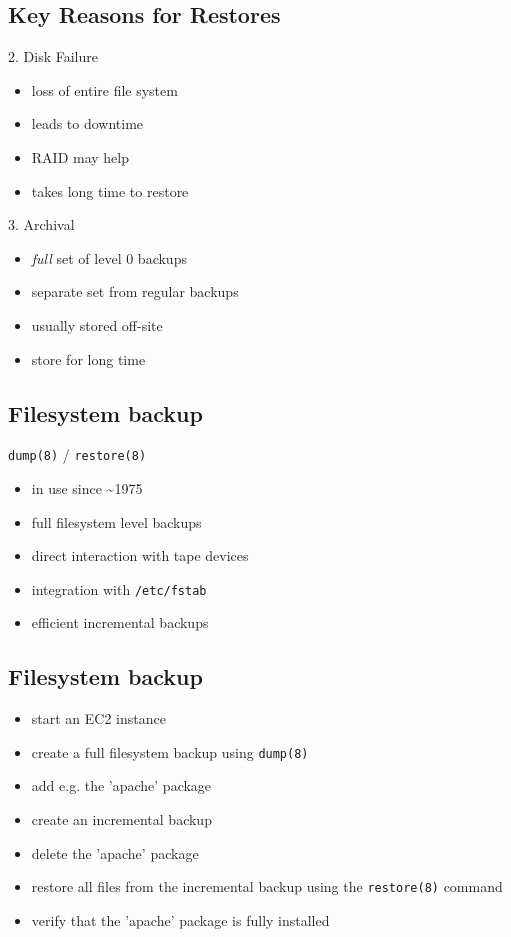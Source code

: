 \documentclass[xga]{xdvislides}
\begin{document}
\subsection{Key Reasons for Restores}
2. Disk Failure
\begin{itemize}
	\item loss of entire file system
	\item leads to downtime
	\item RAID may help
	\item takes long time to restore
\end{itemize}
\addvspace{.5in}
3. Archival
\begin{itemize}
	\item {\em full} set of level 0 backups
	\item separate set from regular backups
	\item usually stored off-site
	\item store for long time
\end{itemize}

\subsection{Filesystem backup}
{\tt dump(8)} / {\tt restore(8)}
\begin{itemize}
	\item in use since \~{}1975
	\item full filesystem level backups
	\item direct interaction with tape devices
	\item integration with {\tt /etc/fstab}
	\item efficient incremental backups
\end{itemize}

\subsection{Filesystem backup}
\begin{itemize}
	\item start an EC2 instance
	\item create a full filesystem backup using \verb+dump(8)+
	\item add e.g. the 'apache' package
	\item create an incremental backup
	\item delete the 'apache' package
	\item restore all files from the incremental backup using the \verb+restore(8)+ command
	\item verify that the 'apache' package is fully installed
\end{itemize}
\end{document}
